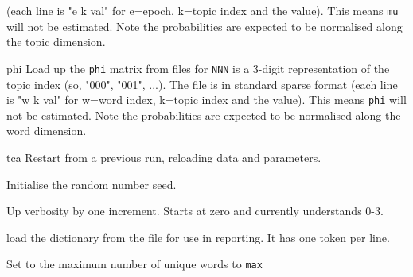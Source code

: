\documentclass[a4paper,english]{article}
\begin{document}
\begin{Description}
\begin{Description}[type]
(each line is "e k val" for e=epoch, k=topic index
and the value).
This means \texttt{mu} will not be estimated.
Note the probabilities are expected to be normalised along the topic dimension.
\item[phi]
Load up the \texttt{phi} matrix from files 
for \texttt{NNN} is a 3-digit representation of the topic index
(so, "000", "001", ...).
The file is in standard sparse format
(each line is "w k val" for w=word index, k=topic index
and the value).
This means \texttt{phi} will not be estimated.
Note the probabilities are expected to be normalised along the word dimension.
\item[tca] 
Restart from a previous run, reloading data and parameters.
\end{Description}
\item[\OptArg{-s}{seed}]
Initialise the random number seed.
\item[\OptArg{-v}] Up verbosity by one increment.
Starts at zero and currently understands 0-3.
\item[\Opt{-V}]  load the dictionary from the
 file for use in reporting.  It has one token per line.
\item[\OptArg{-W}{max}] Set to the maximum number of unique words to \texttt{max}
\end{Description}
\end{document}
